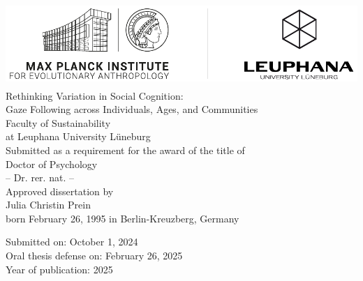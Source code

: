 \documentclass[
]{scrbook}
\author{}
\date{\vspace{-2.5em}}
\begin{document}
\frontmatter

\begin{titlepage}                   
    \begin{center}
        \includegraphics[height=3.2cm]{logo.pdf}\\[40mm]
        
        \huge {\linespread{1.5} Rethinking Variation in Social Cognition: \\ Gaze Following across Individuals, Ages, and Communities}\\[30mm]
        
                
        \normalsize 
        Faculty of Sustainability \\ 
        at Leuphana University Lüneburg\\
        Submitted as a requirement for the award of the title of\\ [10mm]
        
        Doctor of Psychology\\
        -- Dr. rer. nat. --\\[10mm]
        
        Approved dissertation by\\
        Julia Christin Prein\\[10mm]
        
        born February 26, 1995 in Berlin-Kreuzberg, Germany
        
    \vspace*{\fill} 
    \end{center}
    
    \newpage
    \thispagestyle{empty}
    \begin{flushleft}
      \begin{normalsize}
      \vspace*{5mm}
      
            Submitted on: \tabto*{45mm} October 1, 2024 \\
            
            Oral thesis defense on: \tabto*{45mm} February 26, 2025 \\
            
            Year of publication: \tabto*{45mm} 2025 \\[10mm]
            

\end{normalsize}
\end{flushleft}
\end{titlepage}
\end{document}
